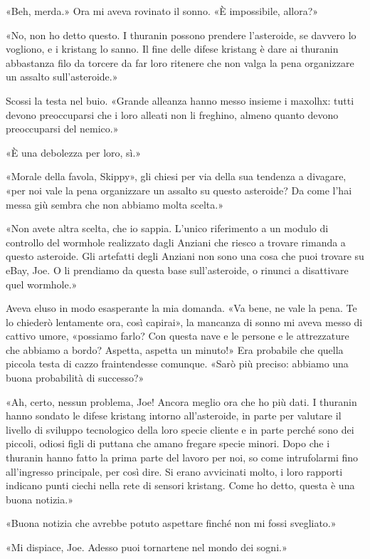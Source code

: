 «Beh, merda.» Ora mi aveva rovinato il sonno. «È impossibile, allora?»

«No, non ho detto questo. I thuranin possono prendere l'asteroide, se
davvero lo vogliono, e i kristang lo sanno. Il fine delle difese
kristang è dare ai thuranin abbastanza filo da torcere da far loro
ritenere che non valga la pena organizzare un assalto sull'asteroide.»

Scossi la testa nel buio. «Grande alleanza hanno messo insieme i
maxolhx: tutti devono preoccuparsi che i loro alleati non li freghino,
almeno quanto devono preoccuparsi del nemico.»

«È una debolezza per loro, sì.»

«Morale della favola, Skippy», gli chiesi per via della sua tendenza a
divagare, «per noi vale la pena organizzare un assalto su questo
asteroide? Da come l'hai messa giù sembra che non abbiamo molta scelta.»

«Non avete altra scelta, che io sappia. L'unico riferimento a un modulo
di controllo del wormhole realizzato dagli Anziani che riesco a trovare
rimanda a questo asteroide. Gli artefatti degli Anziani non sono una
cosa che puoi trovare su eBay, Joe. O li prendiamo da questa base
sull'asteroide, o rinunci a disattivare quel wormhole.»

Aveva eluso in modo esasperante la mia domanda. «Va bene, ne vale la
pena. Te lo chiederò lentamente ora, così capirai», la mancanza di sonno
mi aveva messo di cattivo umore, «possiamo farlo? Con questa nave e le
persone e le attrezzature che abbiamo a bordo? Aspetta, aspetta un
minuto!» Era probabile che quella piccola testa di cazzo fraintendesse
comunque. «Sarò più preciso: abbiamo una buona probabilità di successo?»

«Ah, certo, nessun problema, Joe! Ancora meglio ora che ho più dati. I
thuranin hanno sondato le difese kristang intorno all'asteroide, in
parte per valutare il livello di sviluppo tecnologico della loro specie
cliente e in parte perché sono dei piccoli, odiosi figli di puttana che
amano fregare specie minori. Dopo che i thuranin hanno fatto la prima
parte del lavoro per noi, so come intrufolarmi fino all'ingresso
principale, per così dire. Si erano avvicinati molto, i loro rapporti
indicano punti ciechi nella rete di sensori kristang. Come ho detto,
questa è una buona notizia.»

«Buona notizia che avrebbe potuto aspettare finché non mi fossi
svegliato.»

«Mi dispiace, Joe. Adesso puoi tornartene nel mondo dei sogni.»


